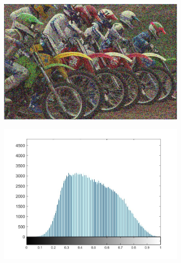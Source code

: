 \begin{figure}
\begin{subfigure}[b]{0.23\textwidth}
         \includegraphics[width=\textwidth]{./figs/noise}
         \caption{}
         \label{fig:nss13}
     \end{subfigure}
     \begin{subfigure}[b]{0.23\textwidth}
         \centering
         \includegraphics[width=\textwidth]{./figs/mscn_histnoise}
         \caption{}
         \label{fig:nss14}
     \end{subfigure}
     \begin{subfigure}[b]{0.23\textwidth}
         \centering

\end{subfigure}
\end{figure}
